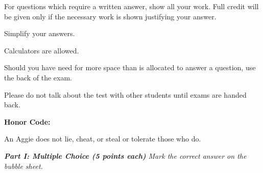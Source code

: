 \documentclass[11pt]{article}
\begin{document}
\Head
\begin{instructions}
\item For questions which require a written answer, show all your work.  Full credit will be given only if the necessary work is shown justifying your answer.
\item Simplify your answers.
\item Calculators are allowed.
\item Should you have need for more space than is allocated to answer a question, use the back of the exam.
\item Please do not talk about the test with other students until exams are handed back.
\item \textbf{Honor Code:}

\vspace{0.1in}
An Aggie does not lie, cheat, or steal or tolerate those who do.
\vspace{0.3in}

\par\noindent\makebox[2.5in]{\hrulefill} 
\par\noindent{}     
\end{instructions}
\newpage

\vspace{.2in}

\noindent \emph{{\bf Part I: Multiple Choice (5 points each)} Mark the correct
answer on the bubble sheet.}
\end{document}
